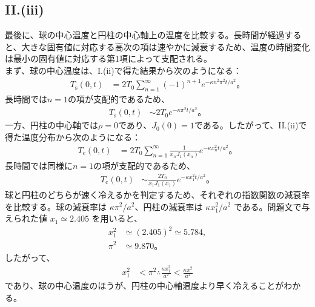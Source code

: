 \documentclass[platex,dvipdfmx,a4paper]{jsarticle}
\begin{document}
  \subsection*{II.(iii)}
  最後に、球の中心温度と円柱の中心軸上の温度を比較する。長時間が経過すると、大きな固有値に対応する高次の項は速やかに減衰するため、温度の時間変化は最小の固有値に対応する第1項によって支配される。\\
  まず、球の中心温度は、I.(ii)で得た結果から次のようになる：
  \begin{align*}
    T_{\mathrm{s}}(0,t)
    &=2T_0\sum_{n=1}^{\infty}
      (-1)^{n+1}
      e^{-\kappa n^2\pi^2t/a^2}。
  \end{align*}
  長時間では$n=1$の項が支配的であるため、
  \begin{align*}
    T_{\mathrm{s}}(0,t)
    &\sim 2T_0e^{-\kappa\pi^2t/a^2}。
  \end{align*}
  一方、円柱の中心軸では$\rho=0$であり、$J_0(0)=1$である。したがって、II.(ii)で得た温度分布から次のようになる：
  \begin{align*}
    T_{\mathrm{c}}(0,t)
    &=2T_0\sum_{n=1}^{\infty}
      \frac{1}{x_nJ_1(x_n)}
      e^{-\kappa x_n^2t/a^2}。
  \end{align*}
  長時間では同様に$n=1$の項が支配的であるため、
  \begin{align*}
    T_{\mathrm{c}}(0,t)
    &\sim
      \frac{2T_0}{x_1J_1(x_1)}
      e^{-\kappa x_1^2t/a^2}。
  \end{align*}
  球と円柱のどちらが速く冷えるかを判定するため、それぞれの指数関数の減衰率を比較する。球の減衰率は $\kappa\pi^2/a^2$、円柱の減衰率は $\kappa x_1^2/a^2$ である。問題文で与えられた値 $x_1\simeq2.405$ を用いると、
  \begin{align*}
    x_1^2&\simeq(2.405)^2\simeq5.784,\\
    \pi^2&\simeq9.870。
  \end{align*}
  したがって、
  \begin{align*}
    x_1^2&<\pi^2 \therefore \frac{\kappa x_1^2}{a^2}<\frac{\kappa\pi^2}{a^2}
  \end{align*}
  であり、球の中心温度のほうが、円柱の中心軸温度より早く冷えることがわかる。
\end{document}

